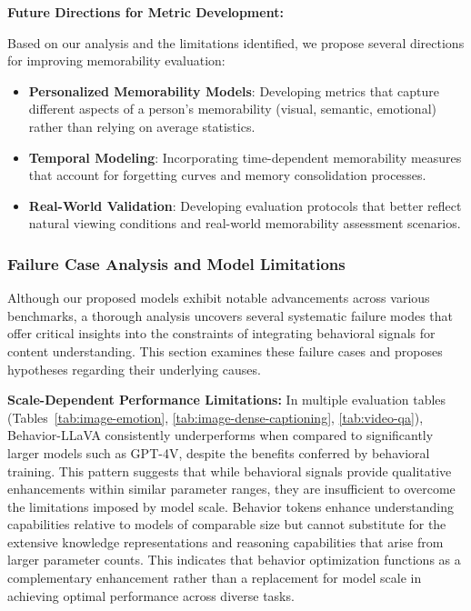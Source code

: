 \textbf{Future Directions for Metric Development:}

Based on our analysis and the limitations identified, we propose several directions for improving memorability evaluation:

\begin{itemize}
    \item \textbf{Personalized Memorability Models}: Developing metrics that capture different aspects of a person's memorability (visual, semantic, emotional) rather than relying on average statistics.
    \item \textbf{Temporal Modeling}: Incorporating time-dependent memorability measures that account for forgetting curves and memory consolidation processes.
    \item \textbf{Real-World Validation}: Developing evaluation protocols that better reflect natural viewing conditions and real-world memorability assessment scenarios. 
\end{itemize}












%
%

\subsubsection{Failure Case Analysis and Model Limitations}
\label{sec:failure_cases}

Although our proposed models exhibit notable advancements across various benchmarks, a thorough analysis uncovers several systematic failure modes that offer critical insights into the constraints of integrating behavioral signals for content understanding. This section examines these failure cases and proposes hypotheses regarding their underlying causes.

\textbf{Scale-Dependent Performance Limitations:}
In multiple evaluation tables (Tables~\ref{tab:image-emotion}, \ref{tab:image-dense-captioning}, \ref{tab:video-qa}), Behavior-LLaVA consistently underperforms when compared to significantly larger models such as GPT-4V, despite the benefits conferred by behavioral training. This pattern suggests that while behavioral signals provide qualitative enhancements within similar parameter ranges, they are insufficient to overcome the limitations imposed by model scale. Behavior tokens enhance understanding capabilities relative to models of comparable size but cannot substitute for the extensive knowledge representations and reasoning capabilities that arise from larger parameter counts. This indicates that behavior optimization functions as a complementary enhancement rather than a replacement for model scale in achieving optimal performance across diverse tasks.


